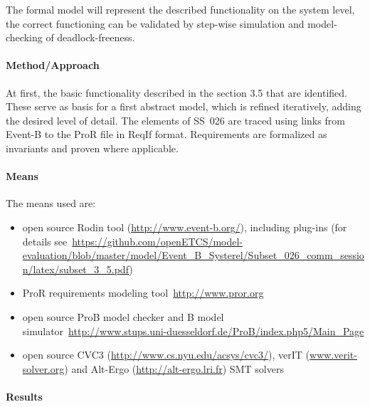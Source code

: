 The formal model will represent the described functionality on the system level,
the correct functioning can be validated by step-wise simulation and
model-checking of deadlock-freeness.


\paragraph{Method/Approach}
\label{sec:methodapproach}

At first, the basic functionality described in the section 3.5 that are
identified. These serve as basis for a first abstract model, which is refined
iteratively, adding the desired level of detail. The elements of SS~026 are
traced using links from Event-B to the ProR file in ReqIf format. Requirements
are formalized as invariants and proven where applicable.

\paragraph{Means}
\label{sec:means}

The means used are:
\begin{itemize}
\item open source Rodin tool (\url{http://www.event-b.org/}), including plug-ins
  (for details
  see~\url{https://github.com/openETCS/model-evaluation/blob/master/model/Event_B_Systerel/Subset_026_comm_session/latex/subset_3_5.pdf})
\item ProR requirements modeling tool~\url{http://www.pror.org}
\item open source ProB model checker and B model
  simulator~\url{http://www.stups.uni-duesseldorf.de/ProB/index.php5/Main_Page}
\item open source CVC3 (\url{http://www.cs.nyu.edu/acsys/cvc3/}), verIT
  (\url{www.verit-solver.org}) and Alt-Ergo (\url{http://alt-ergo.lri.fr}) SMT
  solvers
\end{itemize}



\paragraph{Results}
\label{sec:results}

